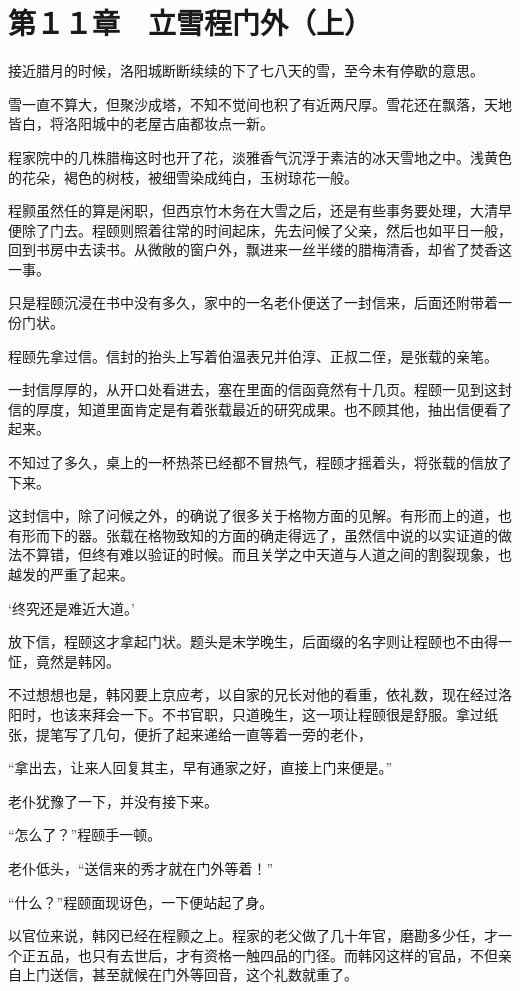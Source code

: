 \section{第１１章　立雪程门外（上）}

接近腊月的时候，洛阳城断断续续的下了七八天的雪，至今未有停歇的意思。

雪一直不算大，但聚沙成塔，不知不觉间也积了有近两尺厚。雪花还在飘落，天地皆白，将洛阳城中的老屋古庙都妆点一新。

程家院中的几株腊梅这时也开了花，淡雅香气沉浮于素洁的冰天雪地之中。浅黄色的花朵，褐色的树枝，被细雪染成纯白，玉树琼花一般。

程颢虽然任的算是闲职，但西京竹木务在大雪之后，还是有些事务要处理，大清早便除了门去。程颐则照着往常的时间起床，先去问候了父亲，然后也如平日一般，回到书房中去读书。从微敞的窗户外，飘进来一丝半缕的腊梅清香，却省了焚香这一事。

只是程颐沉浸在书中没有多久，家中的一名老仆便送了一封信来，后面还附带着一份门状。

程颐先拿过信。信封的抬头上写着伯温表兄并伯淳、正叔二侄，是张载的亲笔。

一封信厚厚的，从开口处看进去，塞在里面的信函竟然有十几页。程颐一见到这封信的厚度，知道里面肯定是有着张载最近的研究成果。也不顾其他，抽出信便看了起来。

不知过了多久，桌上的一杯热茶已经都不冒热气，程颐才摇着头，将张载的信放了下来。

这封信中，除了问候之外，的确说了很多关于格物方面的见解。有形而上的道，也有形而下的器。张载在格物致知的方面的确走得远了，虽然信中说的以实证道的做法不算错，但终有难以验证的时候。而且关学之中天道与人道之间的割裂现象，也越发的严重了起来。

‘终究还是难近大道。’

放下信，程颐这才拿起门状。题头是末学晚生，后面缀的名字则让程颐也不由得一怔，竟然是韩冈。

不过想想也是，韩冈要上京应考，以自家的兄长对他的看重，依礼数，现在经过洛阳时，也该来拜会一下。不书官职，只道晚生，这一项让程颐很是舒服。拿过纸张，提笔写了几句，便折了起来递给一直等着一旁的老仆，

“拿出去，让来人回复其主，早有通家之好，直接上门来便是。”

老仆犹豫了一下，并没有接下来。

“怎么了？”程颐手一顿。

老仆低头，“送信来的秀才就在门外等着！”

“什么？”程颐面现讶色，一下便站起了身。

以官位来说，韩冈已经在程颢之上。程家的老父做了几十年官，磨勘多少任，才一个正五品，也只有去世后，才有资格一触四品的门径。而韩冈这样的官品，不但亲自上门送信，甚至就候在门外等回音，这个礼数就重了。


